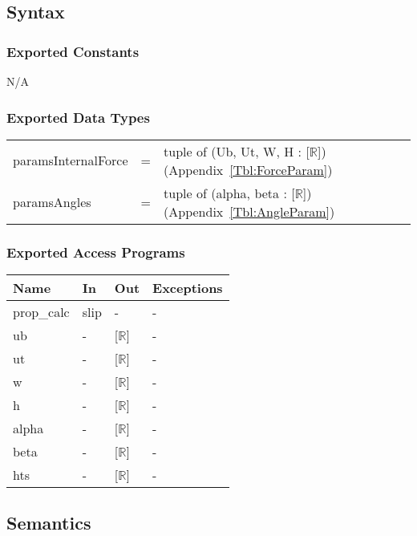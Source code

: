 \documentclass[12pt, titlepage]{article}
\begin{document}
\subsection{Syntax}

\subsubsection{Exported Constants}
N/A

\subsubsection{Exported Data Types}
\renewcommand*{\arraystretch}{1.5}
\begin{longtable}{p{} c p{}}
	paramsInternalForce &=& tuple of (Ub, Ut, W, H : [$\mathbb{R}$]) 
	(Appendix~\ref{Tbl:ForceParam})\\
	paramsAngles &=& tuple of (alpha, beta : [$\mathbb{R}$]) 
	(Appendix~\ref{Tbl:AngleParam}) \\
\end{longtable}

\subsubsection{Exported Access Programs}

\begin{center}
	\renewcommand*{\arraystretch}{1.5}
	\begin{tabular} {p{}  p{}  p{} 
			p{} } \hline 
		\textbf{Name} & \textbf{In} & \textbf{Out} & \textbf{Exceptions} \\ 
		\hline

  prop\_calc & slip & - & - \\ 
  ub & - & [$\mathbb{R}$] & - \\
  ut & - & [$\mathbb{R}$] & - \\
  w & - & [$\mathbb{R}$] & - \\
  h & - & [$\mathbb{R}$] & - \\
  alpha & - & [$\mathbb{R}$] & - \\
  beta & - & [$\mathbb{R}$] & - \\
  hts & - & [$\mathbb{R}$] & - \\ \hline
\end{tabular}
\end{center}

\subsection{Semantics}
\end{document}
